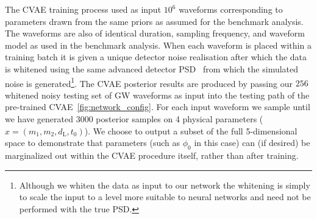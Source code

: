 %
%
The \ac{CVAE} training process used as input $10^{6}$ waveforms corresponding
to parameters drawn from the same priors as assumed for the benchmark analysis.
The waveforms are also of identical duration, sampling frequency, and waveform
model as used in the benchmark analysis. When each waveform is placed within a
training batch it is given a unique detector noise realisation after which the
data is whitened using the same advanced detector
\ac{PSD}~\cite{aligo_noisecurves} from which the simulated noise is
generated\footnote{Although we whiten the data as input to our network the
whitening is simply to scale the input to a level more suitable to neural
networks and need not be performed with the true \ac{PSD}.}. The \ac{CVAE}
posterior results are produced by passing our $256$ whitened noisy testing set
of \ac{GW} waveforms as input into the testing path of the pre-trained
\ac{CVAE}~\ref{fig:network_config}. For each input waveform we sample until we
have generated $3000$ posterior samples on 4 physical parameters
($x=(m_1,m_2,d_{\text{L}},t_{0})$). We choose to output a subset of the full
5-dimensional space to demonstrate that parameters (such as $\phi_0$ in this
case) can (if desired) be marginalized out within the \ac{CVAE} procedure
itself, rather than after training. 

